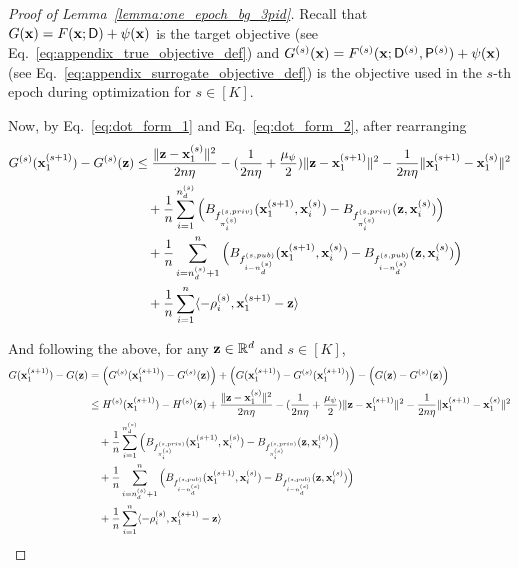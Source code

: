 \begin{proof}[Proof of Lemma~\ref{lemma:one_epoch_bg_3pid}]
    Recall that $G({\mathbf{x}}) = F({\mathbf{x}}; {\mathsf{D}}) + \psi({\mathbf{x}})$ is the target objective (see Eq.~\ref{eq:appendix_true_objective_def}) and $G^{(s)}({\mathbf{x}}) = F^{(s)}({\mathbf{x}}; {\mathsf{D}}^{(s)}, {\mathsf{P}}^{(s)}) + \psi({\mathbf{x}})$ (see Eq.~\ref{eq:appendix_surrogate_objective_def}) is the objective used in the $s$-th epoch during optimization for $s\in [K]$. 
        
    Now, by Eq.~\ref{eq:dot_form_1} and Eq.~\ref{eq:dot_form_2}, after rearranging
    \begin{align}
        G^{(s)}({\mathbf{x}}_1^{(s+1)}) - G^{(s)}({\mathbf{z}})
        &\leq \frac{\|{\mathbf{z}} - {\mathbf{x}}_1^{(s)}\|^2}{2n \eta} - (\frac{1}{2n \eta} + \frac{\mu_\psi}{2}) \|{\mathbf{z}} - {\mathbf{x}}_1^{(s+1)}\|^2
        - \frac{1}{2n \eta}\|{\mathbf{x}}_1^{(s+1)} - {\mathbf{x}}_1^{(s)}\|^2\\
        \nonumber
        &\quad + \frac{1}{n} \sum_{i=1}^{n_d^{(s)}}\Big(
            B_{f_{\pi_i^{(s)}}^{(s, priv)}}({\mathbf{x}}_1^{(s+1)}, {\mathbf{x}}_i^{(s)}) - B_{f_{\pi_i^{(s)}}^{(s, priv)}}({\mathbf{z}}, {\mathbf{x}}_i^{(s)})
        \Big)\\
        \nonumber
        &\quad + \frac{1}{n} \sum_{i=n_d^{(s)}+1}^{n}\Big(
            B_{f_{i-n_d^{(s)}}^{(s, pub)}}({\mathbf{x}}_1^{(s+1)}, {\mathbf{x}}_i^{(s)})
            - B_{f_{i-n_d^{(s)}}^{(s, pub)}}({\mathbf{z}}, {\mathbf{x}}_i^{(s)})
        \Big) \\
        \nonumber
        &\quad + \frac{1}{n}\sum_{i=1}^{n}\langle -\rho_i^{(s)}, {\mathbf{x}}_1^{(s+1)} - {\mathbf{z}}\rangle
    \end{align}


    
    And following the above, for any ${\mathbf{z}}\in \mathbb{R}^d$ and $s\in [K]$, 
    \begin{align}
        G({\mathbf{x}}_1^{(s+1)}) - G({\mathbf{z}})
        &=\left( G^{(s)}({\mathbf{x}}_1^{(s+1)}) - G^{(s)}({\mathbf{z}}) \right)
        + \left( G({\mathbf{x}}_1^{(s+1)}) - G^{(s)}({\mathbf{x}}_1^{(s+1)}) \right)
        -  \left( G({\mathbf{z}}) - G^{(s)}({\mathbf{z}}) \right)\\
        &\leq H^{(s)}({\mathbf{x}}_1^{(s+1)}) - H^{(s)}({\mathbf{z}})
        + \frac{\|{\mathbf{z}} - {\mathbf{x}}_1^{(s)}\|^2}{2n \eta} - (\frac{1}{2n \eta} + \frac{\mu_\psi}{2}) \|{\mathbf{z}} - {\mathbf{x}}_1^{(s+1)}\|^2
        - \frac{1}{2n \eta}\|{\mathbf{x}}_1^{(s+1)} - {\mathbf{x}}_1^{(s)}\|^2\\
        \nonumber
        &\quad + \frac{1}{n} \sum_{i=1}^{n_d^{(s)}}\Big(
            B_{f_{\pi_i^{(s)}}^{(s, priv)}}({\mathbf{x}}_1^{(s+1)}, {\mathbf{x}}_i^{(s)}) - B_{f_{\pi_i^{(s)}}^{(s, priv)}}({\mathbf{z}}, {\mathbf{x}}_i^{(s)})
        \Big)\\
        \nonumber
        &\quad + \frac{1}{n} \sum_{i=n_d^{(s)}+1}^{n}\Big(
            B_{f_{i-n_d^{(s)}}^{(s, pub)}}({\mathbf{x}}_1^{(s+1)}, {\mathbf{x}}_i^{(s)})
            - B_{f_{i-n_d^{(s)}}^{(s, pub)}}({\mathbf{z}}, {\mathbf{x}}_i^{(s)})
        \Big) \\
        \nonumber
        &\quad + \frac{1}{n}\sum_{i=1}^{n}\langle -\rho_i^{(s)}, {\mathbf{x}}_1^{(s+1)} - {\mathbf{z}}\rangle
    \end{align}

\end{proof}


